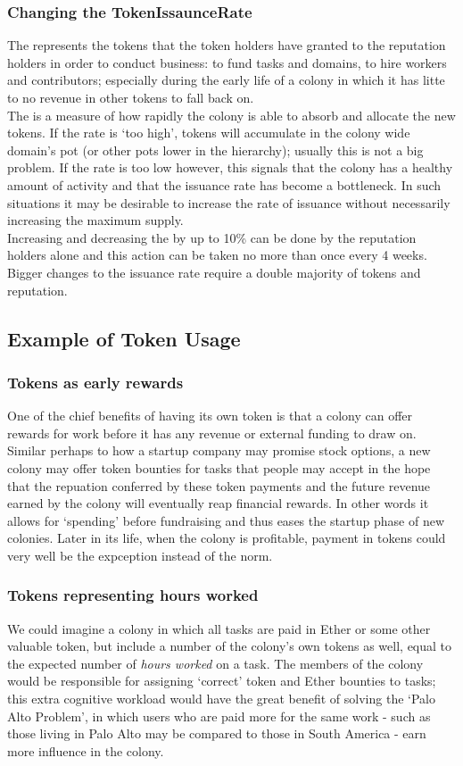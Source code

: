 \subsubsection{Changing the TokenIssaunceRate}
The  represents the tokens that the token holders have granted to the reputation holders in order to conduct business: to fund tasks and domains, to hire workers and contributors; especially during the early life of a colony in which it has litte to no revenue in other tokens to fall back on.\\
The  is a measure of how rapidly the colony is able to absorb and allocate the new tokens. If the rate is `too high', tokens will accumulate in the colony wide domain's pot (or other pots lower in the hierarchy); usually this is not a big problem. If the rate is too low however, this signals that the colony has a healthy amount of activity and that the issuance rate has become a bottleneck. In such situations it may be desirable to increase the rate of issuance without necessarily increasing the maximum supply. \\
Increasing and decreasing the  by up to 10\% can be done by the reputation holders alone and this action can be taken no more than once every 4 weeks. Bigger changes to the issuance rate require a double majority of tokens and reputation.


\subsection{Example of Token Usage}\label{sec:colony-token-examples}
\subsubsection*{Tokens as early rewards}
One of the chief benefits of having its own token is that a colony can offer rewards for work before it has any revenue or external funding to draw on. Similar perhaps to how a startup company may promise stock options, a new colony may offer token bounties for tasks that people may accept in the hope that the repuation conferred by these token payments and the future revenue earned by the colony will eventually reap financial rewards. In other words it allows for `spending' before fundraising and thus eases the startup phase of new colonies. Later in its life, when the colony is profitable, payment in tokens could very well be the expception instead of the norm.
\subsubsection*{Tokens representing hours worked}
We could imagine a colony in which all tasks are paid in Ether or some other valuable token, but include a number of the colony's own tokens as well, equal to the expected number of \emph{hours worked} on a task. The members of the colony would be responsible for assigning `correct' token and Ether bounties to tasks; this extra cognitive workload would have the great benefit of solving the `Palo Alto Problem', in which users who are paid more for the same work - such as those living in Palo Alto may be compared to those in South America - earn more influence in the colony. 
